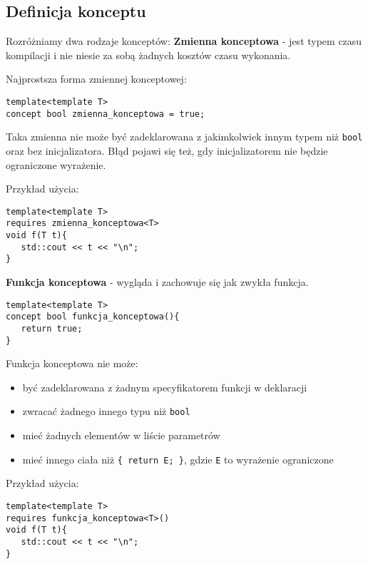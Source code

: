 \documentclass[11pt, a4paper]{article}
\begin{document}
\lstset{language=C++}

\subsection{Definicja konceptu}

Rozróżniamy dwa rodzaje konceptów:\newline\newline
\noindent\textbf{Zmienna konceptowa} - jest typem czasu kompilacji i nie niesie za sobą żadnych kosztów czasu wykonania.

\noindent Najprostsza forma zmiennej konceptowej:\newline
\begin{lstlisting}[frame=single]
template<template T>
concept bool zmienna_konceptowa = true;
\end{lstlisting}

Taka zmienna nie może być zadeklarowana z jakimkolwiek innym typem niż \verb#bool# oraz bez inicjalizatora. Błąd pojawi się też, gdy inicjalizatorem nie będzie ograniczone wyrażenie.

\noindent Przykład użycia:
\begin{lstlisting}[frame=single]
template<template T>
requires zmienna_konceptowa<T>
void f(T t){
   std::cout << t << "\n";
}
\end{lstlisting}

\noindent\textbf{Funkcja konceptowa} - wygląda i zachowuje się jak zwykła funkcja.\newline
\begin{lstlisting}[frame=single]
template<template T>
concept bool funkcja_konceptowa(){
   return true;
}
\end{lstlisting}

Funkcja konceptowa nie może:
\begin{itemize}
\item być zadeklarowana z żadnym specyfikatorem funkcji w deklaracji
\item zwracać żadnego innego typu niż \verb#bool#
\item mieć żadnych elementów w liście parametrów
\item mieć innego ciała niż \verb#{ return E; }#, gdzie \verb#E# to wyrażenie ograniczone
\end{itemize}

\noindent Przykład użycia:
\begin{lstlisting}[frame=single]
template<template T>
requires funkcja_konceptowa<T>()
void f(T t){
   std::cout << t << "\n";
}
\end{lstlisting}
\end{document}
